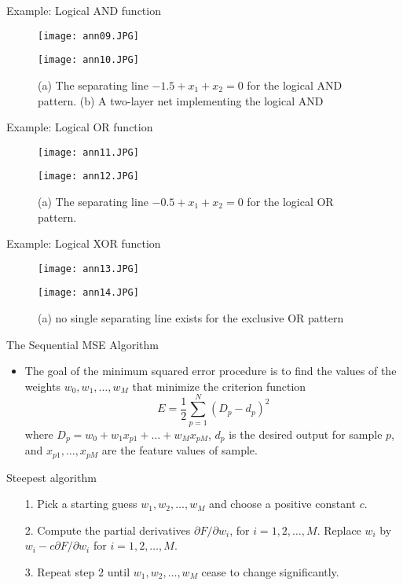 \begin{frame}{Example: Logical AND function}
\begin{figure}
\texttt{[image: ann09.JPG]}
\end{figure}
\begin{figure}
\texttt{[image: ann10.JPG]}
\caption{(a) The separating line $-1.5+x_1+x_2=0$ for the logical AND pattern. (b) A two-layer net implementing the logical AND}
\end{figure}
\end{frame}

\begin{frame}{Example: Logical OR function}
\begin{figure}
\texttt{[image: ann11.JPG]}
\end{figure}
\begin{figure}
\texttt{[image: ann12.JPG]}
\caption{(a) The separating line $-0.5+x_1+x_2=0$ for the logical OR pattern.}
\end{figure}
\end{frame}

\begin{frame}{Example: Logical XOR function}
\begin{figure}
\texttt{[image: ann13.JPG]}
\end{figure}
\begin{figure}
\texttt{[image: ann14.JPG]}
\caption{(a) no single separating line exists for the exclusive OR pattern}
\end{figure}
\end{frame}

\begin{frame}{The Sequential MSE Algorithm}
\begin{itemize}
\item The goal of the minimum squared error procedure is to find the values of the weights $w_0,w_1,\ldots,w_M$ that minimize the criterion function
\begin{equation}
E = \frac{1}{2}\sum\limits_{p = 1}^N {{{({D_p} - {d_p})}^2}} \nonumber
\end{equation}
where
$D_p=w_0+w_1x_{p1}+\ldots+w_Mx_{pM}$, $d_p$ is the desired output for sample $p$, and $x_{p1},\ldots,x_{pM}$ are the feature values of sample.
\end{itemize}
\end{frame}

\begin{frame}{Steepest algorithm}
\begin{itemize}
\item[1.] Pick a starting guess $w_1,w_2,\ldots,w_M$ and choose a positive constant $c$.
\item[2.] Compute the partial derivatives $\partial F/\partial w_i$, for $i=1,2,\ldots,M$. Replace $w_i$ by $w_i-c\partial F/\partial w_i$ for $i=1,2,\ldots,M$.
\item[3.] Repeat step 2 until $w_1,w_2,\ldots,w_M$ cease to change significantly.
\end{itemize}
\end{frame}

